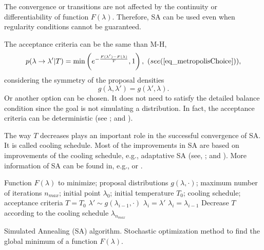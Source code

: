 \begin{remark}
The convergence or transitions are not affected by the continuity or
differentiability of function $F(\lambda)$. Therefore, SA can be used even when regularity conditions cannot be guaranteed. 
\end{remark}

The acceptance criteria can be the same than M-H,
$$
  p(\lambda \rightarrow \lambda' | T) = \min\left( e^{-\frac{F(\lambda')-F(\lambda)}{T}} , 1 \right),
  \ \text(see (\ref{eq_metropolisChoice})),  
$$
considering the symmetry of the proposal densities 
$$
  g(\lambda,\lambda') = g(\lambda',\lambda).
$$
Or another option can be chosen. 
It does not need to satisfy the detailed balance condition since the goal is not simulating a distribution. 
In fact, the acceptance criteria can be deterministic (see \textcite{dueck1990}; and \textcite{franz2001}).

The way $T$ decreases plays an important role in the successful convergence of SA. 
It is called cooling schedule.
Most of the improvements in SA are based on improvements of the cooling schedule, e.g., adaptative SA (see, \textcite{ingber1989}; and \textcite{ingber2000}).
More information of SA can be found in, e.g., \textcite{henderson2003} or \textcite{rao2009}.



\vspace{5mm}
\begin{algorithm}[H]
\SetAlgoLined
   Function $F(\lambda)$ to minimize; proposal distributions $g(\lambda,\cdot)$; maximum number of iterations $n_{max}$; initial point $\lambda_0$; initial temperature $T_0$; cooling schedule; acceptance criteria\;
  $T = T_0$\;
  {
    $\lambda' \sim g(\lambda_{i-1},\cdot)$\;
    {
      $\lambda_i = \lambda'$\;
    }
    \Else
    {
      $\lambda_i = \lambda_{i-1}$\;
    }
    Decrease $T$ according to the cooling schedule\;
  }
   $\lambda_{n_{max}}$\;
\caption[Simulated Annealing (SA) algorithm]
{
  Simulated Annealing (SA) algorithm. Stochastic optimization method to find the global minimum of a function $F(\lambda)$.
}
\label{alg_SA}
\end{algorithm}
\vspace{5mm}


